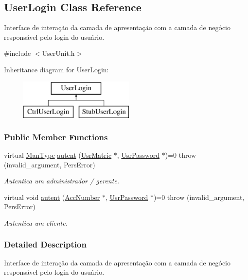 \hypertarget{classUserLogin}{\subsection{User\-Login Class Reference}
\label{d4/de1/classUserLogin}
}


Interface de interação da camada de apresentação com a camada de negócio responsável pelo login do usuário.  




{\ttfamily \#include $<$User\-Unit.\-h$>$}

Inheritance diagram for User\-Login\-:\begin{figure}[H]
\begin{center}
\leavevmode
\includegraphics[height=2.000000cm]{d4/de1/classUserLogin}
\end{center}
\end{figure}
\subsubsection*{Public Member Functions}
\begin{DoxyCompactItemize}
\item 
virtual \hyperlink{classUsrType}{Man\-Type} \hyperlink{classUserLogin_a15141f463faedae30e40115658fcc0b9}{autent} (\hyperlink{classUsrMatric}{Usr\-Matric} $\ast$, \hyperlink{classUsrPassword}{Usr\-Password} $\ast$)=0  throw (invalid\-\_\-argument, Pers\-Error)
\begin{DoxyCompactList}\small\item\em Autentica um administrador / gerente. \end{DoxyCompactList}\item 
virtual void \hyperlink{classUserLogin_a7163b2b97915fd0e3e5d3f76c2af44da}{autent} (\hyperlink{classAccNumber}{Acc\-Number} $\ast$, \hyperlink{classUsrPassword}{Usr\-Password} $\ast$)=0  throw (invalid\-\_\-argument, Pers\-Error)
\begin{DoxyCompactList}\small\item\em Autentica um cliente. \end{DoxyCompactList}\end{DoxyCompactItemize}


\subsubsection{Detailed Description}
Interface de interação da camada de apresentação com a camada de negócio responsável pelo login do usuário. 



